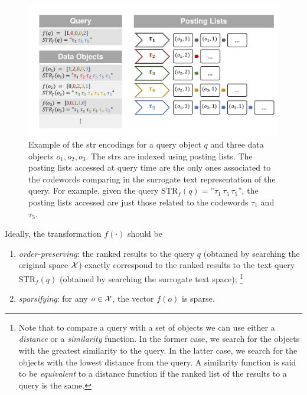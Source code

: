 \begin{figure}
\centering
\includegraphics[trim=0mm 5mm 0mm 0mm,clip, width=1\textwidth]{PostingList.pdf}
\caption{Example of the \gls{str} encodings for a query object $q$ and three data objects $o_1, o_2, o_3$.
The \glspl{str} are indexed using posting lists.
The posting lists accessed at query time are the only ones associated to the codewords comparing in the surrogate text representation of the query.
For example, given the query $\text{STR}_f(q)=$''$\tau_1\, \tau_5\, \tau_5$'', the posting lists accessed are just those related to the codewords $\tau_1$ and $\tau_5$.}
\label{fig:str:posting-list}
\end{figure}

Ideally, the transformation $f(\cdot)$ should be
\begin{enumerate}
	\item \emph{order-preserving}:  the ranked results to the query $q$ (obtained by searching the original space $\mathcal{X}$) exactly correspond to the ranked results to the text query $\text{STR}_f(q)$ (obtained by searching the surrogate text space);%
\footnote{Note that to compare a query with a set of objects we can use either a \emph{distance} or a \emph{similarity} function.
In the former case, we search for the objects with the greatest similarity to the query.
In the latter case, we search for the objects with the lowest distance from the query. A similarity function is said to be \emph{equivalent} to a distance function if the ranked list of the results to a query is the same.}
	\item \emph{sparsifying}: for any $o \in\mathcal{X}$, the vector $f(o)$ is sparse.
\end{enumerate}

